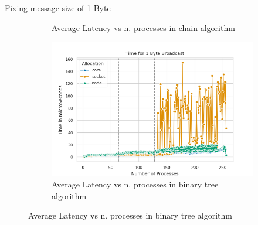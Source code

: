 \documentclass[11pt]{beamer}
\begin{document}
\begin{frame}{Fixing message size of 1 Byte}
\begin{figure}[h]
\begin{subfigure}{0.45\textwidth}
			\caption{Average Latency vs n. processes in chain algorithm}
			\label{fig:bcastchain1byte}
		\end{subfigure}
		\begin{subfigure}{0.45\textwidth}
			\centering
			\includegraphics[width=0.7\linewidth]{../exercise1/plots/bcast_bintree_1byte}
			\caption{Average Latency vs n. processes in binary tree algorithm}
			\label{fig:bcastbintree1byte}
		\end{subfigure}
	\end{figure}
\end{frame}
\end{document}
